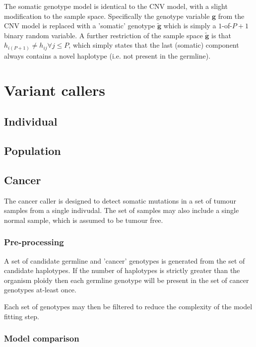 \documentclass{article}
\begin{document}
The somatic genotype model is identical to the CNV model, with a slight modification to the sample space. Specifically the genotype variable $\boldsymbol{g}$ from the CNV model is replaced with a 'somatic' genotype $\tilde{\boldsymbol{g}}$ which is simply a $1$-of-$P + 1$ binary random variable. A further restriction of the sample space $\tilde{\boldsymbol{g}}$ is that $h_{i(P + 1)} \ne h_{ij} \forall j \le P$, which simply states that the last (somatic) component always contains a novel haplotype (i.e. not present in the germline).

\section{Variant callers}

\subsection{Individual}

\subsection{Population}

\subsection{Cancer}

The cancer caller is designed to detect somatic mutations in a set of tumour samples from a single indivudal. The set of samples may also include a single normal sample, which is assumed to be tumour free.

\subsubsection{Pre-processing}

A set of candidate germline and 'cancer' genotypes is generated from the set of candidate haplotypes. If the number of haplotypes is strictly greater than the organism ploidy then each germline genotype will be present in the set of cancer genotypes at-least once. 

Each set of genotypes may then be filtered to reduce the complexity of the model fitting step.

\subsubsection{Model comparison}
\end{document}
